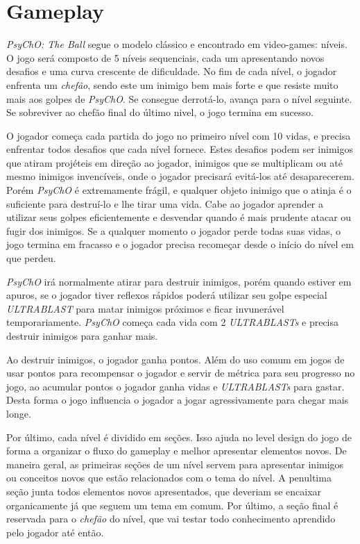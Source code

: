 \section{Gameplay}
\label{sec:gameplay}

\textit{PsyChO: The Ball} segue o modelo clássico e encontrado em video-games: níveis. O jogo será composto de 5 níveis sequenciais, cada um apresentando novos desafios e
uma curva crescente de dificuldade. No fim de cada nível, o jogador enfrenta um \textit{chefão}, sendo este um inimigo bem mais forte e que resiste muito mais aos
golpes de \textit{PsyChO}. Se consegue derrotá-lo, avança para o nível seguinte. Se sobreviver ao chefão final do último nivel, o jogo termina em sucesso.

O jogador começa cada partida do jogo no primeiro nível com 10 vidas, e precisa enfrentar todos desafios que cada nível fornece. Estes desafios podem ser
inimigos que atiram projéteis em direção ao jogador, inimigos que se multiplicam ou até mesmo inimigos invencíveis, onde o jogador precisará evitá-los até desaparecerem.
Porém \textit{PsyChO} é extremamente frágil, e qualquer objeto inimigo que o atinja é o suficiente para destruí-lo e lhe tirar uma vida. Cabe ao jogador aprender
a utilizar seus golpes eficientemente e desvendar quando é mais prudente atacar ou fugir dos inimigos. Se a qualquer momento o jogador perde todas suas vidas,
o jogo termina em fracasso e o jogador precisa recomeçar desde o início do nível em que perdeu.

\textit{PsyChO} irá normalmente atirar para destruir inimigos, porém quando estiver em apuros, se o jogador tiver reflexos rápidos poderá utilizar seu golpe especial \textit{ULTRABLAST} para matar inimigos próximos e ficar invunerável temporariamente. \textit{PsyChO} começa cada vida com 2 \textit{ULTRABLASTs} e precisa destruir inimigos
para ganhar mais.

Ao destruir inimigos, o jogador ganha pontos. Além do uso comum em jogos de usar pontos para recompensar o jogador e servir de métrica para seu progresso no jogo,
ao acumular pontos o jogador ganha vidas e \textit{ULTRABLASTs} para gastar. Desta forma o jogo influencia o jogador a jogar agressivamente para chegar mais longe.

Por último, cada nível é dividido em seções. Isso ajuda no level design do jogo de forma a organizar o fluxo do gameplay e melhor apresentar elementos novos. De maneira geral, as primeiras
seções de um nível servem para apresentar inimigos ou conceitos novos que estão relacionados com o tema do nível. A penultima seção junta todos elementos novos apresentados, que deveriam se encaixar organicamente já que seguem um tema em comum. Por último, a seção final é reservada para o \textit{chefão} do nível, que vai testar todo conhecimento aprendido pelo jogador
até então.

